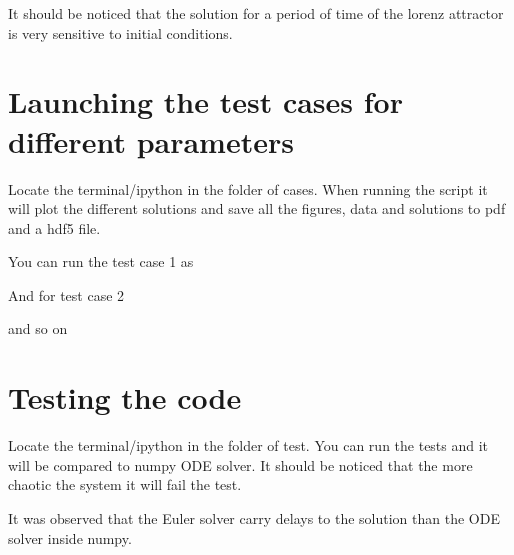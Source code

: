 \documentclass[letterpaper,10pt,english]{sphinxmanual}
\begin{document}
It should be noticed that the solution for a period of time of the lorenz attractor is very sensitive to initial conditions.


\chapter{Launching the test cases for different parameters}
\label{\detokenize{index:launching-the-test-cases-for-different-parameters}}
Locate the terminal/ipython in the folder of cases. When running the script it will plot the different solutions and save all the figures, data and solutions to pdf and a hdf5 file.

You can run the test case 1 as

\begin{sphinxVerbatim}[commandchars=\\\{\}]
 
\end{sphinxVerbatim}

And for test case 2

\begin{sphinxVerbatim}[commandchars=\\\{\}]
 
\end{sphinxVerbatim}

and so on

\begin{sphinxVerbatim}[commandchars=\\\{\}]
 
 
 
\end{sphinxVerbatim}


\chapter{Testing the code}
\label{\detokenize{index:testing-the-code}}
Locate the terminal/ipython in the folder of test. You can run the tests and it will be compared to numpy ODE solver. It should be noticed that the more chaotic the system it will fail the test.

It was observed that the Euler solver carry delays to the solution than the ODE solver inside numpy.
\end{document}
